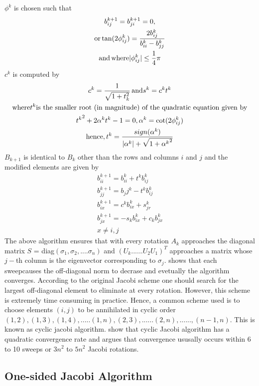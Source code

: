 \documentclass[10pt, conference, compsocconf]{IEEEtran}
\begin{document}
$\phi^k$ is chosen such that 
\begin{gather}
b^{k+1}_{ij} = b^{k+1}_{ji} = 0,\\
\text{or} \thinspace \text{tan}(2\phi^k_{ij}) = \frac{2b^k_{ij}}{b^k_{ii} - b^k_{jj}} \\
\text{and} \thinspace\text{where} |\phi^k_{ij}| \leq \frac{1}{4}\pi 
\end{gather}
$c^k$ is computed by 
\begin{gather}
c^k = \frac{1}{\sqrt{1+t^2_k}} \thinspace \text{and} s^k = c^kt^k \\
\text{where} t^k \text{is the smaller root (in magnitude) of the quadratic equation given by} \\
{t^k}^2 + 2\alpha^kt^k - 1 = 0, \alpha^k = \text{cot}(2\phi^k_{ij}) \\
\text{hence}, t^k = \frac{sign(\alpha^k)}{|\alpha^k| + \sqrt{1+{\alpha^k}^2}}
\end{gather}
$B_{k+1}$ is identical to $B_k$ other than the rows and columns $i$ and $j$ and the modified elements are given by 
\begin{gather}
b_{ii}^{k+1} = b_{ii}^k + t^{k}b_{ij}^k \\
b_{jj}^{k+1} = b_jj^k - t^kb_{ij}^k \\
b_{ix}^{k+1} = c^{k}b_{ix}^k + s^{k}_{jr} \\
b_{jx}^{k+1} = -s_kb^k_{ix} + c_kb^k_{jx} \\
x \neq i,j
\end{gather}
The above algorithm ensures that with every rotation $A_k$ approaches the diagonal matrix $S$ = diag$(\sigma_1, \sigma_2,....\sigma_n)$ and $(U_k......U_2U_1)^T$ approaches a matrix whose $j-$th column is the eigenvector corresponding to $\sigma_j$. 
\cite{luk1989proof} shows that each sweepcauses the off-diagonal norm to decrase and evetually the algorithm converges. According to the original Jacobi scheme one should search for the largest off-diagonal element to eliminate at every rotation. However, this scheme is extremely time consuming in practice. Hence, a common scheme used is to choose elements $(i,j)$ to be annihilated in cyclic order $(1,2), (1,3), (1,4),.....(1,n),(2,3),......(2,n),......,(n-1,n)$. This is known as cyclic jacobi algorithm. \cite{forsythe1960cyclic, schonhage1961konvergenz, wilkinson1962note} show that cyclic Jacobi algorithm has a quadratic convergence rate and argues that convergence ususally occurs within 6 to 10 sweeps or $3n^2$ to $5n^2$ Jacobi rotations.

\subsection{One-sided Jacobi Algorithm}
\end{document}
